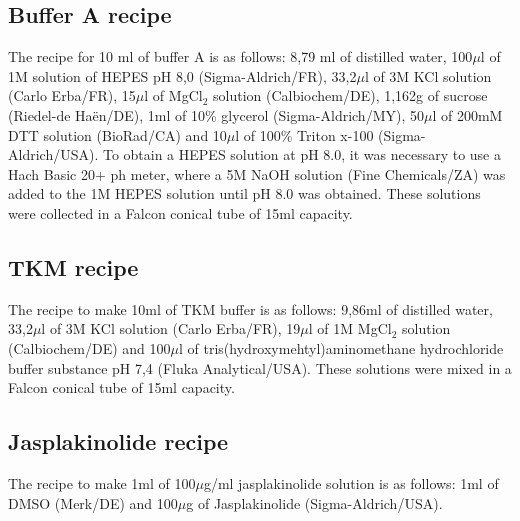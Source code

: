 \documentclass[12pt, a4paper]{article} %
\begin{document}
\subsection{Buffer A recipe}

The recipe for 10 ml of buffer A is as follows: 8,79 ml of distilled water, 100$\mu$l of 1M solution of HEPES pH 8,0 (Sigma-Aldrich/FR), 33,2$\mu$l of 3M KCl solution (Carlo Erba/FR), 15$\mu$l of MgCl$_{2}$ solution (Calbiochem/DE), 1,162g of sucrose (Riedel-de Haën/DE), 1ml of 10\% glycerol (Sigma-Aldrich/MY), 50$\mu$l of 200mM DTT solution (BioRad/CA) and 10$\mu$l of 100\% Triton x-100 (Sigma-Aldrich/USA). To obtain a HEPES solution at pH 8.0, it was necessary to use a Hach Basic 20+ ph meter, where a 5M NaOH solution (Fine Chemicals/ZA) was added to the 1M HEPES solution until pH 8.0 was obtained. These solutions were collected in a Falcon conical tube of 15ml capacity. 

\subsection{TKM recipe}

The recipe to make 10ml of TKM buffer is as follows: 9,86ml of distilled water, 33,2$\mu$l of 3M KCl solution (Carlo Erba/FR), 19$\mu$l of 1M MgCl$_{2}$ solution (Calbiochem/DE) and 100$\mu$l of tris(hydroxymehtyl)aminomethane hydrochloride buffer substance pH 7,4 (Fluka Analytical/USA). These solutions were mixed in a Falcon conical tube of 15ml capacity.

\subsection{Jasplakinolide recipe}

The recipe to make 1ml of 100$\mu$g/ml jasplakinolide solution is as follows: 1ml of DMSO (Merk/DE) and 100$\mu$g of Jasplakinolide (Sigma-Aldrich/USA).
\end{document}
